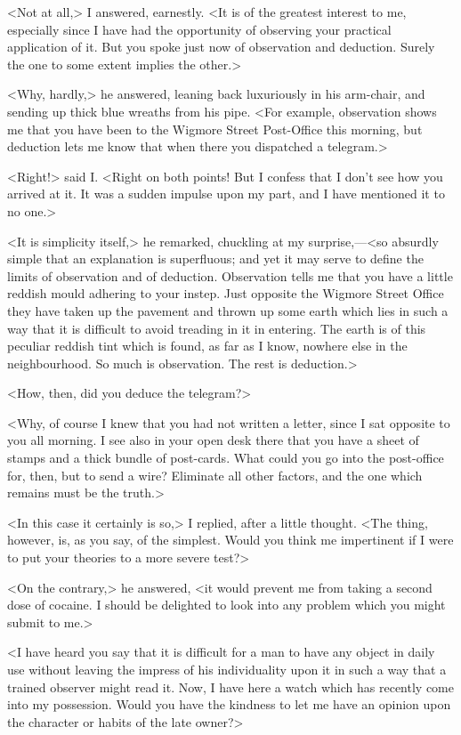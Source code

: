 <Not at all,> I answered, earnestly. <It is of the greatest interest to me, especially since I have had the opportunity of observing your practical application of it. But you spoke just now of observation and deduction. Surely the one to some extent implies the other.>

<Why, hardly,> he answered, leaning back luxuriously in his arm-chair, and sending up thick blue wreaths from his pipe. <For example, observation shows me that you have been to the Wigmore Street Post-Office this morning, but deduction lets me know that when there you dispatched a telegram.>

<Right!> said I\@. <Right on both points! But I confess that I don't see how you arrived at it. It was a sudden impulse upon my part, and I have mentioned it to no one.>

<It is simplicity itself,> he remarked, chuckling at my surprise,—<so absurdly simple that an explanation is superfluous; and yet it may serve to define the limits of observation and of deduction. Observation tells me that you have a little reddish mould adhering to your instep. Just opposite the Wigmore Street Office they have taken up the pavement and thrown up some earth which lies in such a way that it is difficult to avoid treading in it in entering. The earth is of this peculiar reddish tint which is found, as far as I know, nowhere else in the neighbourhood. So much is observation. The rest is deduction.>

<How, then, did you deduce the telegram?>

<Why, of course I knew that you had not written a letter, since I sat opposite to you all morning. I see also in your open desk there that you have a sheet of stamps and a thick bundle of post-cards. What could you go into the post-office for, then, but to send a wire? Eliminate all other factors, and the one which remains must be the truth.>

<In this case it certainly is so,> I replied, after a little thought. <The thing, however, is, as you say, of the simplest. Would you think me impertinent if I were to put your theories to a more severe test?>

<On the contrary,> he answered, <it would prevent me from taking a second dose of cocaine. I should be delighted to look into any problem which you might submit to me.>

<I have heard you say that it is difficult for a man to have any object in daily use without leaving the impress of his individuality upon it in such a way that a trained observer might read it. Now, I have here a watch which has recently come into my possession. Would you have the kindness to let me have an opinion upon the character or habits of the late owner?>

